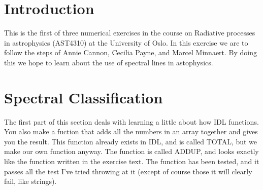 \documentclass{aa}   %
\begin{document}
  



\section{Introduction}   \label{sec:Intro}
This is the first of three numerical exercises in the course on Radiative processes in astrophysics (AST4310) at the University of Oslo. In this exercise we are to follow the steps of Annie Cannon, Cecilia Payne, and Marcel Minnaert. By doing this we hope to learn about the use of spectral lines in astophysics. 


\section{Spectral Classification}    \label{sec:Specclas}
The first part of this section deals with learning a little about how IDL functions.
You also make a fuction that adds all the numbers in an array together and gives you the result.
This function already exists in IDL, and is called TOTAL, but we make our own function anyway.
The function is called ADDUP, and looks exactly like the function written in the exercise text.
The function has been tested, and it passes all the test I've tried throwing at it (except of course those it will clearly fail, like strings).
\end{document}
